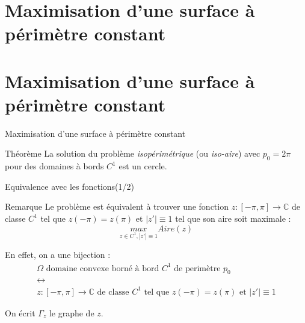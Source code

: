 \documentclass[11pt,envcountsect,aspectratio=169]{beamer} %
\begin{document}
\section{Maximisation d'une surface à périmètre constant}



\section{Maximisation d'une surface à périmètre constant}



\begin{frame}{Maximisation d'une surface à périmètre constant}

\begin{beamerboxesrounded}[upper=titreB,lower=texteB,shadow=true]{Théorème}
        La solution du problème \emph{isopérimétrique} (ou \emph{iso-aire}) avec $p_0=2\pi$ pour des domaines à bords $C^1$ est un cercle.
\end{beamerboxesrounded}

\end{frame}

\begin{frame}{Equivalence avec les fonctions(1/2)}

\begin{beamerboxesrounded}[upper=titreV,lower=texteV,shadow=true]{Remarque}
    Le problème est équivalent à trouver une fonction $z: [-\pi,\pi] \rightarrow \mathbb{C}$ de classe $C^1$ tel que $z(-\pi)=z(\pi)$ et $|z'| \equiv 1$ tel que son aire soit maximale :
    \[ \underset{z \in C^1, |z'|\equiv 1}{max} Aire(z) \]
\end{beamerboxesrounded}

    En effet, on a une bijection :
    \begin{eqnarray*}
    \Omega \text{ domaine convexe borné à bord $C^1$ de perimètre $p_0$} \\ \longleftrightarrow \\ z: [-\pi,\pi] \rightarrow \mathbb{C} \text{ de classe $C^1$ tel que $z(-\pi)=z(\pi)$ et $|z'| \equiv 1$}
    \end{eqnarray*}
    
    On écrit $\Gamma_z$ le graphe de $z$.

\end{frame}
\end{document}
